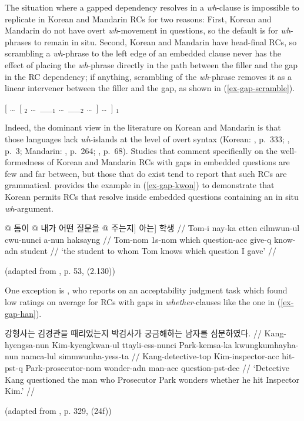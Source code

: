 The situation where a gapped dependency resolves in a \textit{wh}-clause is impossible to replicate in Korean and Mandarin RCs for two reasons: First, Korean and Mandarin do not have overt \textit{wh}-movement in questions, so the default is for \textit{wh}-phrases to remain in situ. Second, Korean and Mandarin have head-final RCs, so scrambling a \textit{wh}-phrase to the left edge of an embedded clause never has the effect of placing the \textit{wh}-phrase directly in the path between the filler and the gap in the RC dependency; if anything, scrambling of the \textit{wh}-phrase removes it as a linear intervener between the filler and the gap, as shown in (\ref{ex-gap-scramble}).

\ex \label{ex-gap-scramble}
[ \dots ~[ $_2$ \dots ~\_\_$_1$ \dots ~\_\_$_2$ \dots ~] \dots ~] $_1$
\xe 

\noindent Indeed, the dominant view in the literature on Korean and Mandarin is that those languages lack \textit{wh}-islands at the level of overt syntax (Korean: \cite{cho2017}, p.~333; \cite{kim.goodall2016}, p.~3; Mandarin: \cite{huang.etal2009}, p.~264; \cite{ning1993}, p.~68). Studies that comment specifically on the well-formedness of Korean and Mandarin RCs with gaps in embedded questions are few and far between, but those that do exist tend to report that such RCs are grammatical. \textcite{kwon2008} provides the example in (\ref{ex-gap-kwon}) to demonstrate that Korean permits RCs that resolve inside embedded questions containing an in situ \textit{wh}-argument.

\ex 
\begingl[everygla = \ko]\label{ex-gap-kwon}
\gla \nogloss{[} @ 톰이 \nogloss{[} @ 내가 어떤 질문을 \nogloss{\_\_ } @ 주는지] 아는] 학생 //
\glb Tom-i nay-ka etten cilmwun-ul cwu-nunci a-nun haksayng //
\glc Tom-{\sc nom} {\sc 1s-nom} which question-{\sc acc} give-{\sc q} know-{\sc adn} student //
\glft *`the student to whom Tom knows which question I gave' //
\endgl
\par\nobreak\vspace{5pt}
\hfill (adapted from \cite{kwon2008}, p. 53, (2.130))
\xe 

\noindent One exception is \textcite{han2013}, who reports on an acceptability judgment task which found low ratings on average for RCs with gaps in \textit{whether}-clauses like the one in (\ref{ex-gap-han}).

\ex 
\begingl[everygla = \ko]\label{ex-gap-han}
\gla 강형사는 김경관을 때리었는지 박검사가 궁금해하는 남자를 심문하였다. //
\glb Kang-hyengsa-nun Kim-kyengkwan-ul ttayli-ess-nunci Park-kemsa-ka kwungkumhayha-nun namca-lul simmwunha-yess-ta //
\glc Kang-detective-{\sc top} Kim-inspector-{\sc acc}  hit-{\sc pst-q} Park-prosecutor-{\sc nom} wonder-{\sc adn} man-{\sc acc} question-{\sc pst-dec} //
\glft *`Detective Kang questioned the man who Prosecutor Park wonders whether he hit Inspector Kim.' //
\endgl
\par\nobreak\vspace{5pt}
\hfill (adapted from \cite{han2013}, p. 329, (24f))
\xe 

